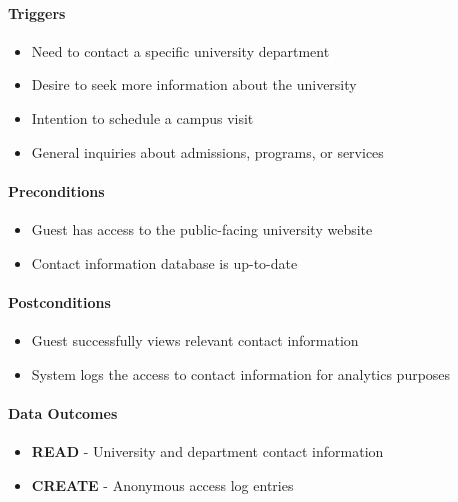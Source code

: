 \paragraph{Triggers}
\begin{itemize}
    \item Need to contact a specific university department
    \item Desire to seek more information about the university
    \item Intention to schedule a campus visit
    \item General inquiries about admissions, programs, or services
\end{itemize}

\paragraph{Preconditions}
\begin{itemize}
    \item Guest has access to the public-facing university website
    \item Contact information database is up-to-date
\end{itemize}

\paragraph{Postconditions}
\begin{itemize}
    \item Guest successfully views relevant contact information
    \item System logs the access to contact information for analytics purposes
\end{itemize}

\paragraph{Data Outcomes}
\begin{itemize}
    \item \textbf{READ} - University and department contact information
    \item \textbf{CREATE} - Anonymous access log entries
\end{itemize}